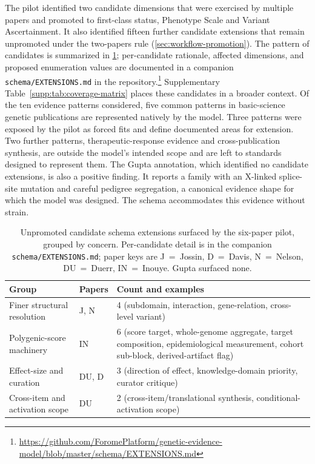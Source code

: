 The pilot identified two candidate dimensions that were exercised by
multiple papers and promoted to first-class status, Phenotype Scale and
Variant Ascertainment. It also identified fifteen further candidate
extensions that remain unpromoted under the two-papers rule
(\cref{sec:workflow-promotion}). The pattern of
candidates is summarized in \cref{tab:candidates}; per-candidate
rationale, affected dimensions, and proposed enumeration values
are documented in a companion \texttt{schema/EXTENSIONS.md} in the
repository.\footnote{\url{https://github.com/ForomePlatform/genetic-evidence-model/blob/master/schema/EXTENSIONS.md}}
Supplementary Table~\ref*{supp:tab:coverage-matrix} places these candidates
in a broader context. Of the ten evidence patterns considered, five common
patterns in basic-science genetic publications are represented natively by
the model. Three patterns were exposed by the pilot as forced fits and define
documented areas for extension. Two further patterns, therapeutic-response
evidence and cross-publication synthesis, are outside the model's intended
scope and are left to standards designed to represent them.
The Gupta annotation, which identified no candidate extensions, is also a
positive finding. It reports a family with an X-linked splice-site mutation
and careful pedigree segregation, a canonical evidence shape for which the
model was designed. The schema accommodates this evidence without strain.

\begin{table}[tbp]
\centering
\caption{Unpromoted candidate schema extensions surfaced by the
six-paper pilot, grouped by concern. Per-candidate detail is in the
companion \texttt{schema/EXTENSIONS.md}; paper keys are J~=~Jossin,
D~=~Davis, N~=~Nelson, DU~=~Duerr, IN~=~Inouye. Gupta surfaced none.}
\label{tab:candidates}
\small
\begin{tabularx}{\linewidth}{@{}llX@{}}
\toprule
Group & Papers & Count and examples \\
\midrule
Finer structural resolution  & J, N   & 4 (subdomain, interaction, gene-relation, cross-level variant) \\
Polygenic-score machinery    & IN     & 6 (score target, whole-genome aggregate, target composition, epidemiological measurement, cohort sub-block, derived-artifact flag) \\
Effect-size and curation     & DU, D  & 3 (direction of effect, knowledge-domain priority, curator critique) \\
Cross-item and activation scope & DU & 2 (cross-item/translational synthesis, conditional-activation scope) \\
\bottomrule
\end{tabularx}
\end{table}

